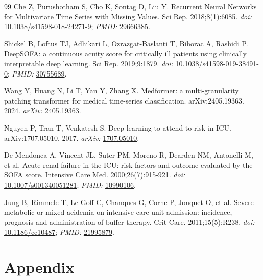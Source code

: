 \documentclass[10pt,twocolumn,letterpaper]{article}
\begin{document}
\begin{thebibliography}{99}
Che Z, Purushotham S, Cho K, Sontag D, Liu Y. Recurrent Neural Networks for Multivariate Time Series with Missing Values. Sci Rep. 2018;8(1):6085. \textit{doi:} \href{https://doi.org/10.1038/s41598-018-24271-9}{10.1038/s41598-018-24271-9}; \textit{PMID:} \href{https://pubmed.ncbi.nlm.nih.gov/29666385/}{29666385}.

Shickel B, Loftus TJ, Adhikari L, Ozrazgat-Baslanti T, Bihorac A, Rashidi P. DeepSOFA: a continuous acuity score for critically ill patients using clinically interpretable deep learning. Sci Rep. 2019;9:1879. \textit{doi:} \href{https://doi.org/10.1038/s41598-019-38491-0}{10.1038/s41598-019-38491-0}; \textit{PMID:} \href{https://pubmed.ncbi.nlm.nih.gov/30755689/}{30755689}.

Wang Y, Huang N, Li T, Yan Y, Zhang X. Medformer: a multi-granularity patching transformer for medical time-series classification. arXiv:2405.19363. 2024. \textit{arXiv:} \href{https://arxiv.org/abs/2405.19363}{2405.19363}.

Nguyen P, Tran T, Venkatesh S. Deep learning to attend to risk in ICU. arXiv:1707.05010. 2017. \textit{arXiv:} \href{https://arxiv.org/abs/1707.05010}{1707.05010}.

De Mendonca A, Vincent JL, Suter PM, Moreno R, Dearden NM, Antonelli M, et al. Acute renal failure in the ICU: risk factors and outcome evaluated by the SOFA score. Intensive Care Med. 2000;26(7):915-921. \textit{doi:} \href{https://doi.org/10.1007/s001340051281}{10.1007/s001340051281}; \textit{PMID:} \href{https://pubmed.ncbi.nlm.nih.gov/10990106/}{10990106}.

Jung B, Rimmele T, Le Goff C, Chanques G, Corne P, Jonquet O, et al. Severe metabolic or mixed acidemia on intensive care unit admission: incidence, prognosis and administration of buffer therapy. Crit Care. 2011;15(5):R238. \textit{doi:} \href{https://doi.org/10.1186/cc10487}{10.1186/cc10487}; \textit{PMID:} \href{https://pubmed.ncbi.nlm.nih.gov/21995879/}{21995879}.

\end{thebibliography}

\clearpage
\onecolumn
\appendix

\section*{Appendix}
\end{document}
